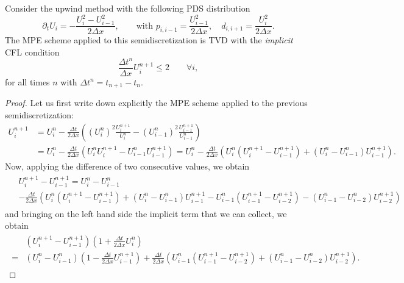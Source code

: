 \documentclass[10pt,a4paper]{amsart}
\begin{document}
\begin{thm}
	Consider the upwind method with the following PDS distribution
	\begin{equation}
		\partial_t U_i = - \frac{U_i^2-U_{i-1}^2}{2\Delta x}, \qquad \text{with } p_{i,i-1}=\frac{U_{i-1}^2}{2\Delta x}, \quad d_{i,i+1}=\frac{U_{i}^2}{2\Delta x}.
	\end{equation}
	The MPE scheme applied to this semidiscretization is TVD with the \textit{implicit }CFL condition
    \begin{equation}\label{eq:implicit_CFL}
        \frac{\Delta t^n}{\Delta x} U_i^{n+1} \leq 2 \qquad \forall i,
    \end{equation}
    for all times $n$ with $\Delta t ^n=t_{n+1}-t_n$.
\end{thm}

\begin{proof}
	Let us first write down explicitly the MPE scheme applied to the previous semidiscretization:
	\begin{align}
		U^{n+1}_i &= U^n_i - \frac{\Delta t}{2\Delta x}\left( (U_i^n)^2 \frac{U_i^{n+1}}{U_i^n}-(U_{i-1}^n)^2 \frac{U_{i-1}^{n+1}}{U_{i-1}^n} \right)\\
		&=U^n_i - \frac{\Delta t}{2\Delta x}\left( U_i^n U_i^{n+1}- U_{i-1}^n U_{i-1}^{n+1}\right) =U^n_i - \frac{\Delta t}{2\Delta x}\left( U_i^n (U_i^{n+1}-U_{i-1}^{n+1})+ (U^n_i-U_{i-1}^n) U_{i-1}^{n+1}\right) .
	\end{align}
	Now, applying the difference of two consecutive values, we obtain
	\begin{align}
    \begin{split}
	&U^{n+1}_i-U^{n+1}_{i-1} =U^n_i -U^n_{i-1}\\
        &- \frac{\Delta t}{2\Delta x}\left( U_i^n (U_i^{n+1}-U_{i-1}^{n+1})+ (U^n_i-U_{i-1}^n) U_{i-1}^{n+1}  
		-U_{i-1}^n (U_{i-1}^{n+1}-U_{i-2}^{n+1})- (U^n_{i-1}-U_{i-2}^n) U_{i-2}^{n+1}\right)
    \end{split}
	\end{align}
	and bringing on the left hand side the implicit term that we can collect, we obtain
	\begin{align}
    \begin{split}
		&(U^{n+1}_i-U^{n+1}_{i-1})\left(1+\frac{\Delta t}{2\Delta x}U^n_i\right) \\
        =&(U^n_i -U^n_{i-1})\left(1-\frac{\Delta t}{2\Delta x}U^{n+1}_{i-1}\right)+ \frac{\Delta t}{2\Delta x}\left( 
		U_{i-1}^n (U_{i-1}^{n+1}-U_{i-2}^{n+1})+(U^n_{i-1}-U_{i-2}^n) U_{i-2}^{n+1}\right).
    \end{split}

\end{align}
\end{proof}
\end{document}

